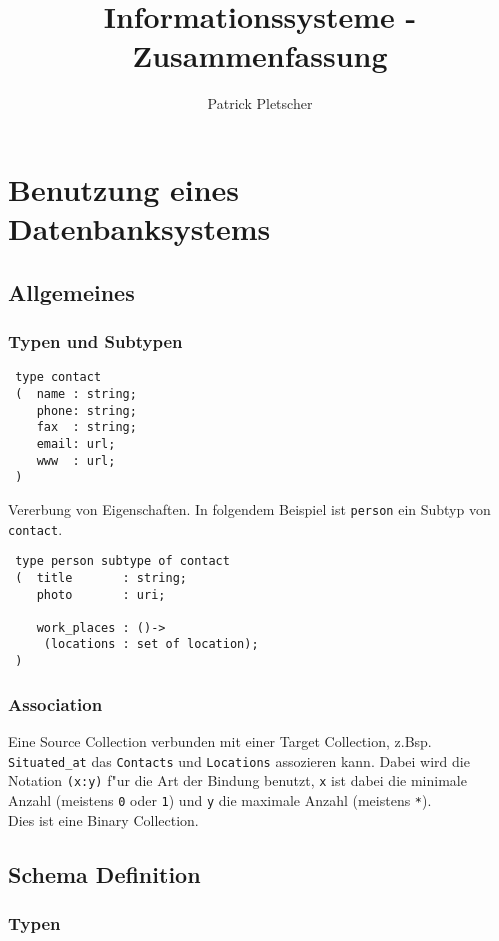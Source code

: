 \documentclass[german, 10pt, a4paper, twocolumn]{scrartcl}
\title{Informationssysteme - Zusammenfassung}
\author{Patrick Pletscher}
\theoremstyle{definition}
\theoremstyle{remark}
\theoremstyle{example}
\begin{document}
\maketitle

\section{Benutzung eines Datenbanksystems}

\subsection{Allgemeines}

\subsubsection{Typen und Subtypen}

\begin{verbatim}
 type contact
 (  name : string;
    phone: string;
    fax  : string;
    email: url;
    www  : url;
 )
\end{verbatim}

Vererbung von Eigenschaften. In folgendem Beispiel ist \texttt{person} ein Subtyp von \texttt{contact}.

\begin{verbatim}
 type person subtype of contact
 (  title       : string;
    photo       : uri;

    work_places : ()->
     (locations : set of location);
 )
\end{verbatim}

\subsubsection{Association}

Eine Source Collection verbunden mit einer Target Collection, z.Bsp. \texttt{Situated\_at} das \texttt{Contacts} und \texttt{Locations} assozieren kann. Dabei wird die Notation \texttt{(x:y)} f"ur die Art der Bindung benutzt, \texttt{x} ist dabei die minimale Anzahl (meistens \texttt{0} oder \texttt{1}) und \texttt{y} die maximale Anzahl (meistens \texttt{*}).\\
Dies ist eine Binary Collection.

\subsection{Schema Definition}

\subsubsection{Typen}
\end{document}
